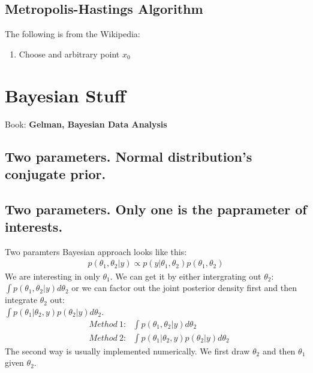 \documentclass[]{article}
\begin{document}
\subsection{Metropolis-Hastings Algorithm}
The following is from the Wikipedia:\\
\begin{enumerate}[1)]
	\item Choose and arbitrary point $x_0$
\end{enumerate}
	
\section{Bayesian Stuff}
Book: \textbf{Gelman, Bayesian Data Analysis}
\subsection{Two parameters. Normal distribution's conjugate prior.}

\subsection{Two parameters. Only one is the paprameter of interests.}
Two paramters Bayesian approach looks like this:
$$
\begin{aligned}
	p(\theta_1, \theta_2|y) \propto p(y|\theta_1, \theta_2)p(\theta_1, \theta_2)
\end{aligned}
$$
We are interesting in only $\theta_1$. We can get it by either intergrating out $\theta_2$: $\int p(\theta_1, \theta_2|y) d\theta_2$ or we can factor out the joint posterior density first and then integrate $\theta_2$ out:\\
$\int p(\theta_1|\theta_2,y)p(\theta_2|y) d\theta_2$.
$$
\begin{aligned}
	&Method~1:~~~\int p(\theta_1, \theta_2|y) d\theta_2\\
	&Method~2:~~~\int p(\theta_1|\theta_2,y)p(\theta_2|y) d\theta_2
\end{aligned}
$$
The second way is usually implemented numerically. We first draw $\theta_2$ and then $\theta_1$ given $\theta_2$.
\end{document}
